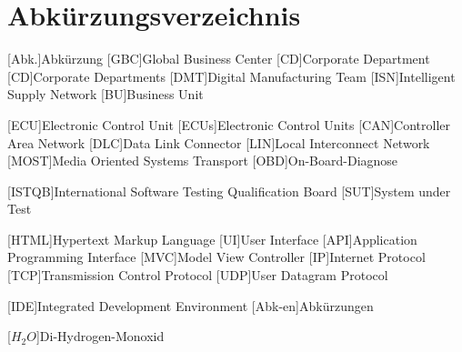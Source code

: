 
\chapter*{Abkürzungsverzeichnis}                   %

\begin{acronym}[DHBW]
 [Abk.]{Abkürzung}
 [GBC]{Global Business Center}
 [CD]{Corporate Department}
 [CD]{Corporate Departments}
 [DMT]{Digital Manufacturing Team}
 [ISN]{Intelligent Supply Network}
 [BU]{Business Unit}
 
 [ECU]{Electronic Control Unit}
 [ECUs]{Electronic Control Units}
 [CAN]{Controller Area Network}
 [DLC]{Data Link Connector}
 [LIN]{Local Interconnect Network}
 [MOST]{Media Oriented Systems Transport}
 [OBD]{On-Board-Diagnose} 
 
 [ISTQB]{International Software Testing Qualification Board}
 [SUT]{System under Test}
 
 [HTML]{Hypertext Markup Language}
 [UI]{User Interface}
 [API]{Application Programming Interface}
 [MVC]{Model View Controller}
 [IP]{Internet Protocol}
 [TCP]{Transmission Control Protocol}
 [UDP]{User Datagram Protocol}
 

 [IDE]{Integrated Development Environment}
 [Abk-en]{Abkürzungen}

 [\ensuremath{H_2O}]{Di-Hydrogen-Monoxid}

\end{acronym}
